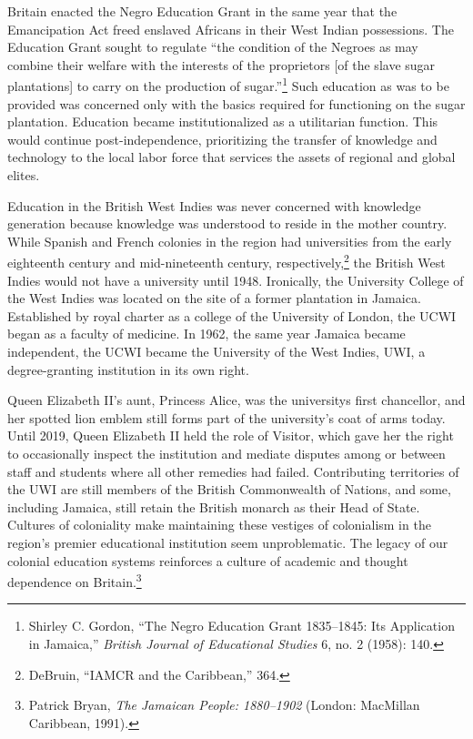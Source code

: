 \documentclass{tufte-handout}
\begin{document}
Britain enacted the Negro Education Grant in the same year that the
Emancipation Act freed enslaved Africans in their West Indian
possessions. The Education Grant sought to regulate ``the condition of
the Negroes as may combine their welfare with the interests of the
proprietors {[}of the slave sugar plantations{]} to carry on the
production of sugar.''\footnote{Shirley C. Gordon, ``The Negro Education
  Grant 1835--1845: Its Application in Jamaica,'' \emph{British Journal
  of Educational Studies} 6, no. 2 (1958): 140.} Such education as was
to be provided was concerned only with the basics required for
functioning on the sugar plantation. Education became institutionalized
as a utilitarian function. This would continue post-independence,
prioritizing the transfer of knowledge and technology to the local labor
force that services the assets of regional and global elites.

Education in the British West Indies was never concerned with knowledge
generation because knowledge was understood to reside in the mother
country. While Spanish and French colonies in the region had
universities from the early eighteenth century and mid-nineteenth
century, respectively,\footnote{DeBruin, ``IAMCR and the Caribbean,''
  364.} the British West Indies would not have a university until 1948.
Ironically, the University College of the West Indies was located on the
site of a former plantation in Jamaica. Established by royal charter as
a college of the University of London, the UCWI began as a faculty of
medicine. In 1962, the same year Jamaica became independent, the UCWI
became the University of the West Indies, UWI, a degree-granting
institution in its own right.

Queen Elizabeth II's aunt, Princess Alice, was the
university\textquotesingle s first chancellor, and her spotted lion
emblem still forms part of the university's coat of arms today. Until
2019, Queen Elizabeth II held the role of Visitor, which gave her the
right to occasionally inspect the institution and mediate disputes among
or between staff and students where all other remedies had failed.
Contributing territories of the UWI are still members of the British
Commonwealth of Nations, and some, including Jamaica, still retain the
British monarch as their Head of State. Cultures of coloniality make
maintaining these vestiges of colonialism in the region's premier
educational institution seem unproblematic. The legacy of our colonial
education systems reinforces a culture of academic and thought
dependence on Britain.\footnote{Patrick Bryan, \emph{The Jamaican
  People: 1880--1902} (London: MacMillan Caribbean, 1991).}
\end{document}
